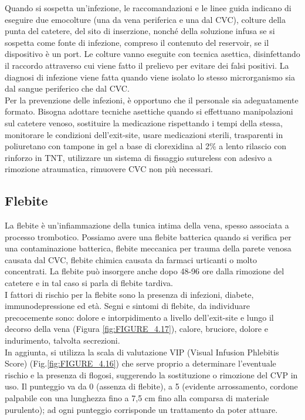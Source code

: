 Quando si sospetta un’infezione, le raccomandazioni e le linee guida indicano di eseguire due emocolture 
(una da vena periferica e una dal CVC), colture della punta del catetere, del sito di inserzione, nonché della 
soluzione infusa se si sospetta come fonte di infezione, compreso il contenuto del reservoir, se il dispositivo è un 
port. Le colture vanno eseguite con tecnica asettica, disinfettando il raccordo attraverso cui viene fatto il 
prelievo per evitare dei falsi positivi. La diagnosi di infezione viene fatta quando viene isolato lo stesso 
microrganismo sia dal sangue periferico che dal CVC\cite{AIOMCVC}.\\
Per la prevenzione delle infezioni, è opportuno che il personale sia adeguatamente formato. Bisogna adottare tecniche 
asettiche quando si effettuano manipolazioni sul catetere venoso, sostituire la medicazione rispettando i tempi della 
stessa, monitorare le condizioni dell’exit-site, usare medicazioni sterili, trasparenti in poliuretano con tampone 
in gel a base di clorexidina al 2\% a lento rilascio con rinforzo in TNT, utilizzare un sistema di fissaggio 
sutureless con adesivo a rimozione atraumatica, rimuovere CVC non più necessari\cite{AIOMCVC}.

\subsection{Flebite}

La flebite è un’infiammazione della tunica intima della vena, spesso associata a processo trombotico. 
Possiamo avere una flebite batterica quando si verifica per una contaminazione batterica, flebite meccanica per 
trauma della parete venosa causata dal CVC, flebite chimica causata da farmaci urticanti o molto concentrati. 
La flebite può insorgere anche dopo 48-96 ore dalla rimozione del catetere e in tal caso si parla di flebite tardiva.\\ 
I fattori di rischio per la flebite sono la presenza di infezioni, diabete, immunodepressione ed età. 
Segni e sintomi di flebite, da individuare precocemente sono: dolore e intorpidimento a livello dell’exit-site e lungo 
il decorso della vena (Figura \ref{fig:FIGURE_4.17}), 
calore, bruciore, dolore e indurimento, talvolta secrezioni\cite{AIOMCVC}.\\
In aggiunta, si utilizza la scala di valutazione VIP (Visual Infusion Phlebitis Score) (Fig.\ref{fig:FIGURE_4.16}) che 
serve proprio a determinare l'eventuale rischio e la presenza di flogosi, 
suggerendo la sostituzione o rimozione del CVP in uso. Il punteggio va da 0 
(assenza di flebite), a 5 (evidente arrossamento, cordone palpabile con una lunghezza fino a 7,5 cm 
fino alla comparsa di materiale purulento); ad ogni punteggio corrisponde un trattamento da poter attuare\cite{FNOPIRIVISTA}.

